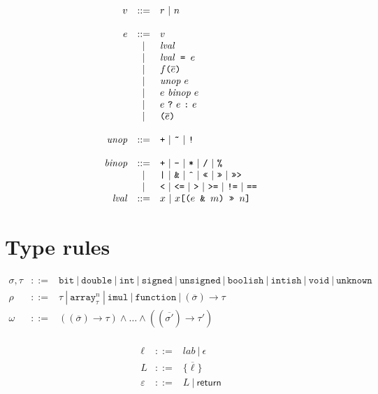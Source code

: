 \documentclass{article}
\newcommand{\ternary}[3]{{#1}\ \mathjs{?}\ {#2}\ \mathjs{:}\ {#3}}
\newcommand{\funcall}[2]{{#1}\mathjs{(}{#2}\mathjs{)}}
\newcommand{\paren}[1]{\mathjs{(}{#1}\mathjs{)}}
\newcommand{\funty}[2]{({#1}) \rightarrow {#2}}
\newcommand{\seq}[1]{\overline{{#1}}}
\newcommand{\mathjs}[1]{\mbox{\texttt{{#1}}}}
\newcommand{\bit}{\mathtt{bit}}
\newcommand{\unsigned}{\mathtt{unsigned}}
\newcommand{\signed}{\mathtt{signed}}
\newcommand{\double}{\mathtt{double}}
\newcommand{\arr}[2]{\mathtt{array}^{#1}_{#2}}
\newcommand{\unk}{\mathtt{unknown}}
\newcommand{\void}{\mathtt{void}}
\newcommand{\mustret}{\mathsf{return}}
\newcommand{\getprop}[2]{{#1}\mathjs{[}{#2}\mathjs{]}}
\renewcommand{\int}{\mathtt{int}}
\newcommand{\function}{\mathtt{function}}
\newcommand{\boolish}{\mathtt{boolish}}
\newcommand{\imul}{\mathtt{imul}}
\newcommand{\intish}{\mathtt{intish}}
\begin{document}
\[
\begin{array}{rcl}
v & ::= & r ~|~ n \\
\\
e & ::= & v \\
  &  |  & \mathit{lval} \\
  &  |  & \mathit{lval}\mathjs{ = }e \\
  &  |  & \funcall{f}{\seq{e}} \\
  &  |  & \mathit{unop}\ e \\
  &  |  & e\ \mathit{binop}\ e \\
  &  |  & \ternary{e}{e}{e} \\
  &  |  & \paren{\seq{e}} \\
\\
\mathit{unop} & ::= & \mathjs{+} ~|~ \mathjs{\~{}} ~|~ \mathjs{!} \\
\\
\mathit{binop} & ::= & \mathjs{+} ~|~ \mathjs{-} ~|~ \mathjs{*} ~|~ \mathjs{/} ~|~ \mathjs{\%} \\
               &  |  & \mathjs{|} ~|~ \mathjs{\&} ~|~ \mathjs{\^{}} ~|~ \mathjs{<<} ~|~ \mathjs{>>} ~|~ \mathjs{>>>} \\
               &  |  & \mathjs{<} ~|~ \mathjs{<=} ~|~ \mathjs{>} ~|~ \mathjs{>=} ~|~ \mathjs{!=} ~|~ \mathjs{==} \\
\mathit{lval} & ::= & x ~|~ \getprop{x}{\paren{e\mathjs{ \& }m}\mathjs{ >> }n} \\
\end{array}
\]

\section{Type rules}

\[
\begin{array}{rcl}
\sigma, \tau & ::= & \bit ~|~ \double ~|~ \int ~|~ \signed ~|~ \unsigned ~|~ \boolish ~|~ \intish ~|~ \void ~|~ \unk \\
\rho & ::= & \tau ~|~ \arr{n}{\tau} ~|~ \imul ~|~ \function ~|~ \funty{\seq{\sigma}}{\tau} \\
\omega & ::= & (\funty{\seq{\sigma}}{\tau}) \land \ldots \land (\funty{\seq{\sigma'}}{\tau'}) \\
\end{array}
\]

\[
\begin{array}{rcl}
\ell        & ::= & \mathit{lab} ~|~ \epsilon \\
L           & ::= & \{ \seq{\ell} \} \\
\varepsilon & ::= & L ~|~ \mustret \\
\end{array}
\]
\end{document}

